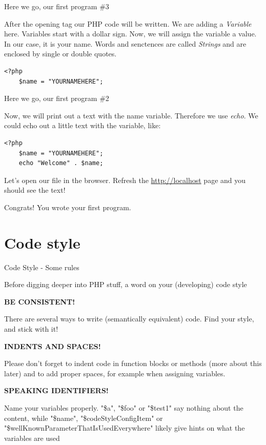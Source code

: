 \begin{frame}[fragile]{Here we go, our first program \#{}3}

After the opening tag our PHP code will be written. We are adding a \emph{Variable} here. Variables start with a dollar sign. \pause Now, we will assign the variable a value. In our case, it is your name. Words and senctences are called \emph{Strings} and are enclosed by single or double quotes.

	\begin{lstlisting}
<?php
	$name = "YOURNAMEHERE";

	\end{lstlisting}
\end{frame}

\begin{frame}[fragile]{Here we go, our first program \#{}2}

Now, we will print out a text with the name variable. Therefore we use \emph{echo}.
We could echo out a little text with the variable, like: \pause

	\begin{lstlisting}
<?php
	$name = "YOURNAMEHERE";
	echo "Welcome" . $name;
	\end{lstlisting}
	\pause



Let's open our file in the browser. Refresh the \url{http://localhost} page and you should see the text! \pause

Congrats! You wrote your first program.

\end{frame}


\section{Code style}
\begin{frame}[fragile]{Code Style - Some rules}

Before digging deeper into PHP stuff, a word on your (developing) code style\pause

\textbf{BE CONSISTENT!} \pause

There are several ways to write (semantically equivalent) code. Find your style, and stick with it!\pause

\textbf{INDENTS AND SPACES!} \pause

Please don't forget to indent code in function blocks or methods (more about this later) and to add proper spaces, for example when assigning variables. \pause


\textbf{SPEAKING IDENTIFIERS!} \pause

Name your variables properly. "\$a", "\$foo" or "\$test1" say nothing about the content, while "\$name", "\$codeStyleConfigItem" or "\$wellKnownParameterThatIsUsedEverywhere" likely give hints on what the variables are used\pause
\end{frame}


